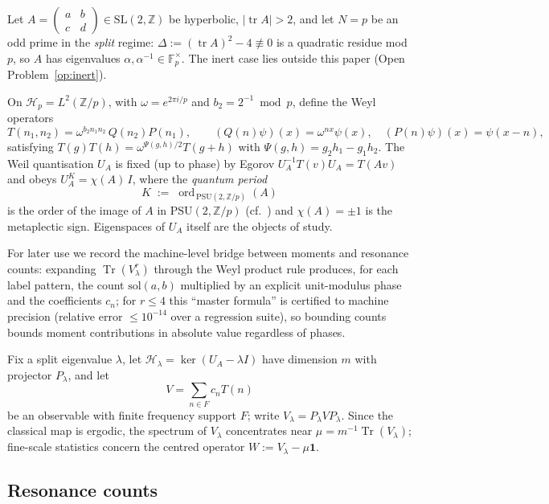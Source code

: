 \documentclass[11pt]{article}
\begin{document}
Let $A=(\begin{smallmatrix}a&b\\ c&d\end{smallmatrix})
\in\mathrm{SL}(2,\mathbb Z)$ be hyperbolic, $|\operatorname{tr}A|>2$,
and let $N=p$ be an odd prime in the \emph{split} regime:
$\Delta:=(\operatorname{tr}A)^2-4\not\equiv0$ is a quadratic residue
mod $p$, so $A$ has eigenvalues $\alpha,\alpha^{-1}\in\mathbb F_p^\times$.
The inert case lies outside this paper (Open Problem~\ref{op:inert}).

On $\mathcal H_p=L^2(\mathbb Z/p)$, with $\omega=e^{2\pi i/p}$ and
$b_2=2^{-1}\bmod p$, define the Weyl operators
\[
T(n_1,n_2)=\omega^{b_2n_1n_2}\,Q(n_2)P(n_1),
\qquad
(Q(n)\psi)(x)=\omega^{nx}\psi(x),\quad
(P(n)\psi)(x)=\psi(x-n),
\]
satisfying $T(g)T(h)=\omega^{\Psi(g,h)/2}T(g+h)$ with
$\Psi(g,h)=g_2h_1-g_1h_2$. The Weil quantisation $U_A$ is fixed (up to
phase) by Egorov $U_A^{-1}T(v)U_A=T(Av)$ and obeys
$U_A^{K}=\chi(A)\,I$, where the \emph{quantum period}
\[
K \;:=\; \operatorname{ord}_{\,\mathrm{PSU}(2,\mathbb Z/p)}(A)
\]
is the order of the image of $A$ in $\mathrm{PSU}(2,\mathbb Z/p)$
(cf.\ \cite{FNDB03}) and
$\chi(A)=\pm1$ is the metaplectic sign. Eigenspaces of $U_A$ itself
are the objects of study.

For later use we record the machine-level bridge between moments and
resonance counts: expanding $\operatorname{Tr}(V_\lambda^r)$ through
the Weyl product rule produces, for each label pattern, the count
$\mathrm{sol}(a,b)$ multiplied by an explicit unit-modulus phase and
the coefficients $c_n$; for $r\le4$ this ``master formula'' is
certified to machine precision (relative error ${\le}10^{-14}$ over a
regression suite), so bounding counts bounds moment contributions in
absolute value regardless of phases.

Fix a split eigenvalue $\lambda$, let
$\mathcal H_\lambda=\ker(U_A-\lambda I)$ have dimension $m$ with
projector $P_\lambda$, and let
\[
V=\sum_{n\in F}c_nT(n)
\]
be an observable with finite frequency support $F$; write
$V_\lambda=P_\lambda VP_\lambda$. Since the classical map is ergodic,
the spectrum of $V_\lambda$ concentrates near
$\mu=m^{-1}\operatorname{Tr}(V_\lambda)$; fine-scale statistics concern
the centred operator $W:=V_\lambda-\mu\mathbf 1$.

\subsection{Resonance counts}
\end{document}
